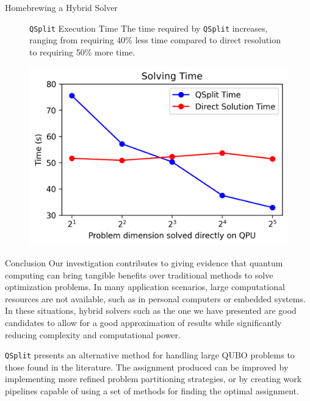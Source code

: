 \documentclass[final]{beamer}
\newlength{\colwidth}
\begin{document}
\begin{frame}[t,fragile]
\begin{columns}[t]
\begin{column}{\colwidth}
\begin{block}{Homebrewing a Hybrid Solver}
    \begin{figure}[h!]
      \centering
      \begin{minipage}{0.35\textwidth}
        \begin{alertblock}{\texttt{QSplit} Execution Time}
          The time required by \texttt{QSplit} increases, ranging from requiring 40\% less time compared to direct resolution to requiring 50\% more time.
        \end{alertblock}
      \end{minipage}%
      \hfill
      \begin{minipage}{0.6\textwidth}
          \centering
          \includegraphics[height=0.15\textheight]{logos/time.png}
      \end{minipage}
    \end{figure}
  \end{block}

  \begin{block}{Conclusion}
    Our investigation contributes to giving evidence that quantum computing can bring tangible benefits over traditional methods to solve optimization problems. 
    In many application scenarios, large computational resources are not available, such as in personal computers or embedded systems. 
    In these situations, hybrid solvers such as the one we have presented are good candidates to allow for a good approximation of results while significantly reducing complexity and computational power.

    \texttt{QSplit} presents an alternative method for handling large QUBO problems to those found in the literature\cite{subqubo2}. 
    The assignment produced can be improved by implementing more refined problem partitioning strategies\cite{bnb}, or by creating work pipelines capable of using a set of methods for finding the optimal assignment\cite{dwavehybrid}.
  \end{block}


\end{column}
\end{columns}
\end{frame}
\end{document}
